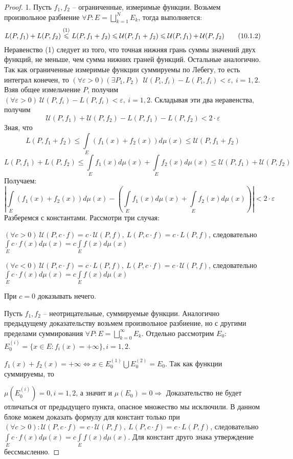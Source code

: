 \begin{proof}
 1. Пусть $f_1, f_2$ -- ограниченные, измеримые функции. Возьмем произвольное разбиение $\forall P: E=\bigsqcup\limits_{k=1}^N E_k$, тогда выполняется:
 \begin{equation}
 	L(P,f_1)+L(P,f_2)\overset{(1)}{\leqslant} L(P, f_1+f_2) \leqslant \mathcal{U}(P, f_1+f_2) \? \leqslant \mathcal{U}(P, f_1)+\mathcal{U}(P, f_2) \tag{10.1.2}\label{10.1.2} 
\end{equation}
Неравенство (1) следует из того, что точная нижняя грань суммы значений двух функций, не меньше, чем сумма нижних граней функций. Остальные аналогично. Так как ограниченные измеримые функции суммируемы по Лебегу, то есть интеграл конечен, то $(\forall \varepsilon >0)(\exists P_1, P_2)\ \ \mathcal{U}(P_i, f_i)-L(P_i, f_i)<\varepsilon,\ i = 1,2.$ Взяв общее измельчение $P$, получим $(\forall \varepsilon >0)\ \mathcal{U}(P, f_i)-L(P, f_i)<\varepsilon,\ i = 1,2.$ Складывая эти два неравенства, получим $$\mathcal{U}(P, f_1)+\mathcal{U}(P, f_2)-L(P,f_1)-L(P,f_2)<2\cdot\varepsilon$$
Зная, что 
$$L(P, f_1+f_2) \leqslant \int\limits_E(f_1(x)+f_2(x))d\mu(x) \leqslant \mathcal{U}(P, f_1+f_2)$$ 
$$L(P, f_1)+L(P, f_2)\leqslant \int\limits_Ef_1(x)d\mu(x)+\int\limits_E f_2(x)d\mu(x) \leqslant \mathcal{U}(P,f_1)+\mathcal{U}(P,f_2)$$
Получаем:
$$\left|\int\limits_E(f_1(x)+f_2(x))d\mu(x)-\left(\int\limits_Ef_1(x)d\mu(x)+\int\limits_E f_2(x)d\mu(x)\right)\right|<2\cdot\varepsilon$$
Разберемся с константами. Рассмотри три случая:

$(\forall c>0)\  \mathcal{U}(P, c\cdot f)=c\cdot \mathcal{U}(P, f),\ L(P, c\cdot f)=c\cdot L(P ,f)$, следовательно $\int\limits_{E}c\cdot f(x) d\mu (x) = c\int\limits_{E}f(x) d\mu (x)$

$(\forall c<0)\  \mathcal{U}(P, c\cdot f)=c\cdot L(P, f),\ L(P, c\cdot f)=c\cdot \mathcal{U}(P ,f)$, следовательно $\int\limits_{E}c\cdot f(x) d\mu (x) = c\int\limits_{E}f(x) d\mu (x)$

При $c = 0$ доказывать нечего.

Пусть $f_1, f_2$ -- неотрицательные, суммируемые функции.
Аналогично предыдущему доказательству возьмем произвольное разбиение, но с другими пределами суммирования $\forall P: E=\bigsqcup\limits_{k=0}^{\infty} E_k$. Отдельно рассмотрим $E_0$:
$E_0^{(i)} = \{x\in E: f_i(x)=+\infty\}, i = 1,2$.

$f_1(x)+f_2(x)=+\infty \Leftrightarrow x\in E_0^{(1)}\bigcup E_0^{(2)} = E_0$. Так как функции суммируемы, то 

$\mu(E_0^{(i)})=0, i = 1, 2$, а значит и $\mu(E_0) = 0 \Rightarrow$ Доказательство не будет отличаться от предыдущего пункта, опасное множество мы исключили. В данном блоке можем доказать формулу для констант только при $(\forall c>0): \mathcal{U}(P, c\cdot f)=c\cdot \mathcal{U}(P, f),\ L(P, c\cdot f)=c\cdot L(P ,f)$, следовательно
$\int\limits_{E}c\cdot f(x) d\mu (x) = c\int\limits_{E}f(x) d\mu (x)$. Для констант друго знака утверждение бессмысленно.


\end{proof}
